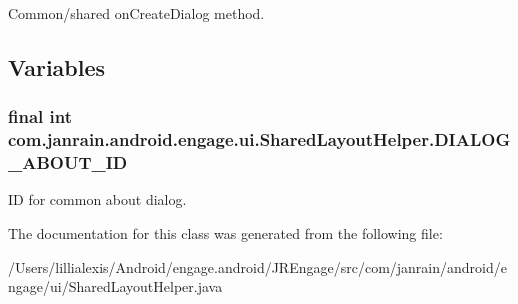\label{classcom_1_1janrain_1_1android_1_1engage_1_1ui_1_1_shared_layout_helper_ac331699d8854ac78dc844cdf1ec2e129}
Common/shared onCreateDialog method. 

\subsection{Variables}
\hypertarget{classcom_1_1janrain_1_1android_1_1engage_1_1ui_1_1_shared_layout_helper_ac040a291f9c62449d43968e317099e54}{
\subsubsection[{DIALOG\_\-ABOUT\_\-ID}]{\setlength{\rightskip}{0pt plus 5cm}final int {\bf com.janrain.android.engage.ui.SharedLayoutHelper.DIALOG\_\-ABOUT\_\-ID}}}
\label{classcom_1_1janrain_1_1android_1_1engage_1_1ui_1_1_shared_layout_helper_ac040a291f9c62449d43968e317099e54}
ID for common about dialog. 

The documentation for this class was generated from the following file:\begin{DoxyCompactItemize}
\item 
/Users/lillialexis/Android/engage.android/JREngage/src/com/janrain/android/engage/ui/SharedLayoutHelper.java\end{DoxyCompactItemize}
